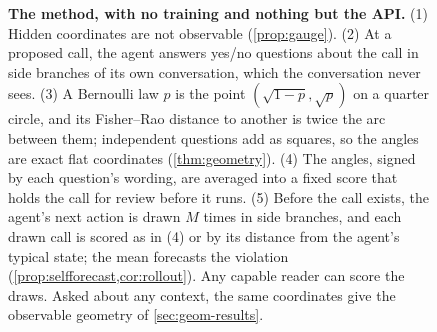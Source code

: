 \begin{figure}[t]
\caption{\textbf{The method, with no training and nothing but the API.} (1) Hidden coordinates are not observable (\cref{prop:gauge}). (2) At a proposed call, the agent answers yes/no questions about the call in side branches of its own conversation, which the conversation never sees. (3) A Bernoulli law $p$ is the point $(\sqrt{1-p},\sqrt p)$ on a quarter circle, and its Fisher--Rao distance to another is twice the arc between them; independent questions add as squares, so the angles are exact flat coordinates (\cref{thm:geometry}). (4) The angles, signed by each question's wording, are averaged into a fixed score that holds the call for review before it runs. (5) Before the call exists, the agent's next action is drawn $M$ times in side branches, and each drawn call is scored as in (4) or by its distance from the agent's typical state; the mean forecasts the violation (\cref{prop:selfforecast,cor:rollout}). Any capable reader can score the draws. Asked about any context, the same coordinates give the observable geometry of \cref{sec:geom-results}.}
\label{fig:method}
\end{figure}
